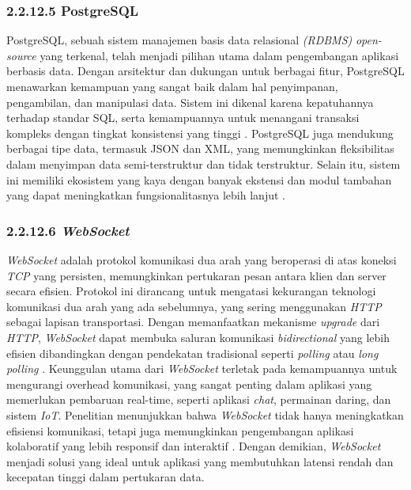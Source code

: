\subsubsection{2.2.12.5 PostgreSQL}
PostgreSQL, sebuah sistem manajemen basis data relasional 
\emph{(RDBMS)} \emph{open-source} yang terkenal, telah menjadi pilihan utama dalam pengembangan aplikasi berbasis data. Dengan arsitektur dan  dukungan untuk berbagai fitur, PostgreSQL menawarkan kemampuan yang sangat baik dalam hal penyimpanan, pengambilan, dan manipulasi data. Sistem ini dikenal karena kepatuhannya terhadap standar SQL, serta kemampuannya untuk menangani transaksi kompleks dengan tingkat konsistensi yang tinggi \cite{postgresql2023docs}. PostgreSQL juga mendukung berbagai tipe data, termasuk JSON dan XML, yang memungkinkan fleksibilitas dalam menyimpan data semi-terstruktur dan tidak terstruktur. Selain itu, sistem ini memiliki ekosistem yang kaya dengan banyak ekstensi dan modul tambahan yang dapat meningkatkan fungsionalitasnya lebih lanjut \cite{postgresql2023docs}.


\subsubsection{2.2.12.6 \emph{WebSocket}}
\emph{WebSocket} adalah protokol komunikasi dua arah yang beroperasi di atas koneksi \emph{TCP} yang persisten, memungkinkan pertukaran pesan antara klien dan server secara efisien. Protokol ini dirancang untuk mengatasi kekurangan teknologi komunikasi dua arah yang ada sebelumnya, yang sering menggunakan \emph{HTTP} sebagai lapisan transportasi. Dengan memanfaatkan mekanisme \emph{upgrade} dari \emph{HTTP}, \emph{WebSocket} dapat membuka saluran komunikasi \emph{bidirectional} yang lebih efisien dibandingkan dengan pendekatan tradisional seperti \emph{polling} atau \emph{long polling} \cite{Fette2011}. Keunggulan utama dari \emph{WebSocket} terletak pada kemampuannya untuk mengurangi overhead komunikasi, yang sangat penting dalam aplikasi yang memerlukan pembaruan real-time, seperti aplikasi \emph{chat}, permainan daring, dan sistem \emph{IoT}. Penelitian menunjukkan bahwa \emph{WebSocket} tidak hanya meningkatkan efisiensi komunikasi, tetapi juga memungkinkan pengembangan aplikasi kolaboratif yang lebih responsif dan interaktif \cite{Milsap2019}. Dengan demikian, \emph{WebSocket} menjadi solusi yang ideal untuk aplikasi yang membutuhkan latensi rendah dan kecepatan tinggi dalam pertukaran data.


